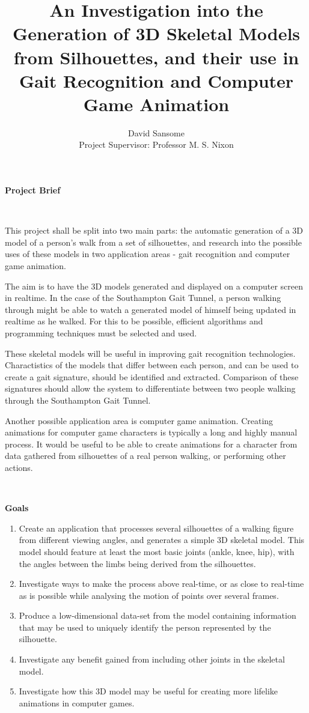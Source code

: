 \documentclass[a4paper,10pt]{article}
\title{An Investigation into the Generation of 3D Skeletal Models from Silhouettes, and their use in Gait Recognition and Computer Game Animation}
\author{David Sansome \\
Project Supervisor: Professor M. S. Nixon}
\begin{document}
\maketitle

\noindent\textbf{Project Brief}

\

This project shall be split into two main parts: the automatic generation of a 3D model of a person's walk from a set of silhouettes,
and research into the possible uses of these models in two application areas - gait recognition and computer game animation.

The aim is to have the 3D models generated and displayed on a computer screen in realtime.
In the case of the Southampton Gait Tunnel, a person walking through might be able to watch a generated
model of himself being updated in realtime as he walked.
For this to be possible, efficient algorithms and programming techniques must be selected and used.

These skeletal models will be useful in improving gait recognition technologies.
Charactistics of the models that differ between each person, and can be used to create a gait signature,
should be identified and extracted.
Comparison of these signatures should allow the system to differentiate between two people walking through
the Southampton Gait Tunnel.

Another possible application area is computer game animation.
Creating animations for computer game characters is typically a long and highly manual process.
It would be useful to be able to create animations for a character from data gathered from silhouettes of
a real person walking, or performing other actions.

\

\noindent\textbf{Goals}

\begin{enumerate}
	\item Create an application that processes several silhouettes of a walking figure from different viewing angles,
		and generates a simple 3D skeletal model.
		This model should feature at least the most basic joints (ankle, knee, hip),
		with the angles between the limbs being derived from the silhouettes.
	\item Investigate ways to make the process above real-time,
		or as close to real-time as is possible while analysing the motion of points over several frames.
	\item Produce a low-dimensional data-set from the model containing information that may be used to uniquely
		identify the person represented by the silhouette.
	\item Investigate any benefit gained from including other joints in the skeletal model.
	\item Investigate how this 3D model may be useful for creating more lifelike animations in computer games.
\end{enumerate}
\end{document}
